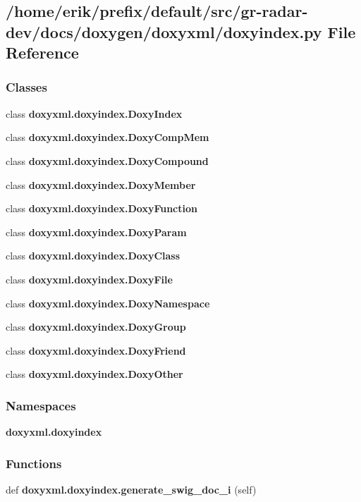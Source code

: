 \subsection{/home/erik/prefix/default/src/gr-\/radar-\/dev/docs/doxygen/doxyxml/doxyindex.py File Reference}
\label{doxyindex_8py}
\subsubsection*{Classes}
\begin{DoxyCompactItemize}
\item 
class {\bf doxyxml.\+doxyindex.\+Doxy\+Index}
\item 
class {\bf doxyxml.\+doxyindex.\+Doxy\+Comp\+Mem}
\item 
class {\bf doxyxml.\+doxyindex.\+Doxy\+Compound}
\item 
class {\bf doxyxml.\+doxyindex.\+Doxy\+Member}
\item 
class {\bf doxyxml.\+doxyindex.\+Doxy\+Function}
\item 
class {\bf doxyxml.\+doxyindex.\+Doxy\+Param}
\item 
class {\bf doxyxml.\+doxyindex.\+Doxy\+Class}
\item 
class {\bf doxyxml.\+doxyindex.\+Doxy\+File}
\item 
class {\bf doxyxml.\+doxyindex.\+Doxy\+Namespace}
\item 
class {\bf doxyxml.\+doxyindex.\+Doxy\+Group}
\item 
class {\bf doxyxml.\+doxyindex.\+Doxy\+Friend}
\item 
class {\bf doxyxml.\+doxyindex.\+Doxy\+Other}
\end{DoxyCompactItemize}
\subsubsection*{Namespaces}
\begin{DoxyCompactItemize}
\item 
 {\bf doxyxml.\+doxyindex}
\end{DoxyCompactItemize}
\subsubsection*{Functions}
\begin{DoxyCompactItemize}
\item 
def {\bf doxyxml.\+doxyindex.\+generate\+\_\+swig\+\_\+doc\+\_\+i} (self)
\end{DoxyCompactItemize}
